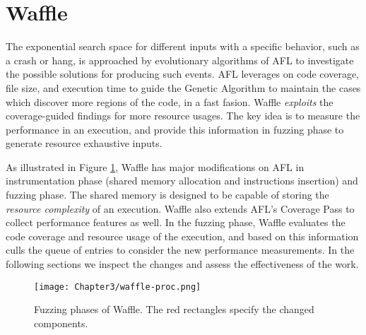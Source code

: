 \section{Waffle}
\label{sec:3-instr}




The exponential search space for different inputs with a specific behavior, such as a crash or hang, is approached by evolutionary algorithms of AFL to investigate the possible solutions for producing such events. AFL leverages on code coverage, file size, and execution time to guide the Genetic Algorithm to maintain the cases which discover more regions of the code, in a fast fasion. Waffle \textit{exploits} the coverage-guided findings for more resource usages. The key idea is to measure the performance in an execution, and provide this information in fuzzing phase to generate resource exhaustive inputs. 


As illustrated in Figure \ref{fig:waffle-phases}, Waffle has major modifications on AFL in instrumentation phase (shared memory allocation and instructions insertion) and fuzzing phase. The shared memory is designed to be capable of storing the \textit{resource complexity} of an execution. Waffle also extends AFL's Coverage Pass to collect performance features as well. In the fuzzing phase, Waffle evaluates the code coverage and resource usage of the execution, and based on this information culls the queue of entries to consider the new performance measurements. In the following sections we inspect the changes and assess the effectiveness of the work.

\begin{figure}[!b]
  \texttt{[image: Chapter3/waffle-proc.png]}
  \centering
  \caption{Fuzzing phases of Waffle. The red rectangles specify the changed components.}
  \label{fig:waffle-phases}
\end{figure}

